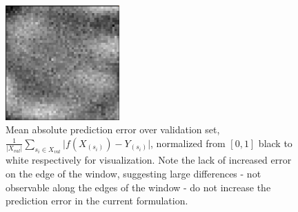 \documentclass[10pt,letterpaper]{article}
\begin{document}
\begin{figure}
	\begin{center}
		\includegraphics[width=0.39\textwidth]{images/mean_error_turbulence.png}
		\caption{\small Mean absolute prediction error over validation set,  $ \frac{1}{\left\vert X_{val} \right\vert} \sum_{s_i \in X_{val}}^{} \vert f(X_{(s_i)}) -  Y_{(s_i)} \vert $, normalized from $[0, 1]$ black to white respectively for visualization. Note the lack of increased error on the edge of the window, suggesting large differences - not observable along the edges of the window - do not increase the prediction error in the current formulation.}
		\label{mean_error}
	\end{center}	
\end{figure}
\end{document}
